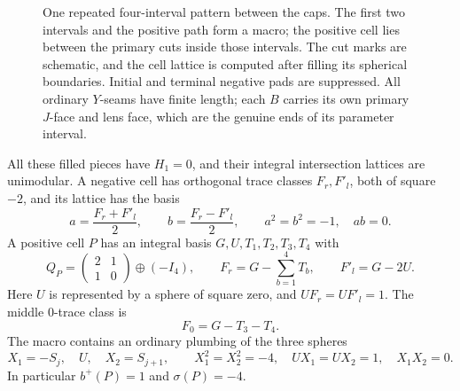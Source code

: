 \begin{figure}[ht]
\centering

\caption{One repeated four-interval pattern between the caps.  The
first two intervals and the positive path form a macro; the positive
cell lies between the primary cuts inside those intervals.  The cut
marks are schematic, and the cell lattice is computed after filling
its spherical boundaries.  Initial and terminal negative pads are
suppressed.  All ordinary \(Y\)-seams have finite length; each
\(B\) carries its own primary \(J\)-face and lens face, which are
the genuine ends of its parameter interval.}
\label{fig:stack:pattern}
\end{figure}

\begin{proposition}
\label{prop:stack:lattice}
All these filled pieces have \(H_1=0\), and their integral intersection
lattices are unimodular.  A negative cell has orthogonal trace classes
\(F_r,F'_l\), both of square \(-2\), and its lattice has the basis
\begin{equation}
 a=\frac{F_r+F'_l}{2},\qquad b=\frac{F_r-F'_l}{2},\qquad
 a^2=b^2=-1,\quad ab=0.
\label{eq:stack:negative-lattice}
\end{equation}
A positive cell \(P\) has an integral basis
\(G,U,T_1,T_2,T_3,T_4\) with
\begin{equation}
 Q_P=\begin{pmatrix}2&1\\1&0\end{pmatrix}\oplus(-I_4),\qquad
 F_r=G-\sum_{b=1}^4T_b,\qquad F'_l=G-2U.
\label{eq:stack:positive-lattice}
\end{equation}
Here \(U\) is represented by a sphere of square zero, and
\(UF_r=UF'_l=1\).  The middle \(0\)-trace class is
\begin{equation}
 F_0=G-T_3-T_4.
\label{eq:stack:middle-class}
\end{equation}
The macro contains an ordinary plumbing of the three spheres
\begin{equation}
 X_1=-S_j,\quad U,\quad X_2=S_{j+1},\qquad
 X_1^2=X_2^2=-4,\quad UX_1=UX_2=1,\quad X_1X_2=0.
\label{eq:stack:macro-plumbing}
\end{equation}
In particular \(b^+(P)=1\) and \(\sigma(P)=-4\).
\end{proposition}

